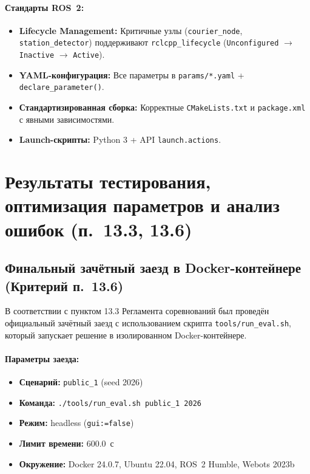 \documentclass[a4paper,11pt]{article}
\begin{document}
\paragraph{Стандарты ROS~2:}
\begin{itemize}[nosep]
    \item \textbf{Lifecycle Management:} Критичные узлы (\texttt{courier\_node}, \texttt{station\_detector}) поддерживают \texttt{rclcpp\_lifecycle} (\texttt{Unconfigured} $\to$ \texttt{Inactive} $\to$ \texttt{Active}).
    \item \textbf{YAML-конфигурация:} Все параметры в \texttt{params/*.yaml} + \texttt{declare\_parameter()}.
    \item \textbf{Стандартизированная сборка:} Корректные \texttt{CMakeLists.txt} и \texttt{package.xml} с явными зависимостями.
    \item \textbf{Launch-скрипты:} Python 3 + API \texttt{launch.actions}.
\end{itemize}


\section{Результаты тестирования, оптимизация параметров и анализ ошибок (п.~13.3, 13.6)}



\subsection{Финальный зачётный заезд в Docker-контейнере (Критерий п.~13.6)}

В соответствии с пунктом 13.3 Регламента соревнований был проведён официальный зачётный заезд с использованием скрипта \texttt{tools/run\_eval.sh}, который запускает решение в изолированном Docker-контейнере.

\paragraph{Параметры заезда:}
\begin{itemize}[leftmargin=*,nosep]
    \item \textbf{Сценарий:} \texttt{public\_1} (seed 2026)
    \item \textbf{Команда:} \texttt{./tools/run\_eval.sh public\_1 2026}
    \item \textbf{Режим:} headless (\texttt{gui:=false})
    \item \textbf{Лимит времени:} 600.0~с
    \item \textbf{Окружение:} Docker 24.0.7, Ubuntu 22.04, ROS~2 Humble, Webots 2023b
\end{itemize}
\end{document}

